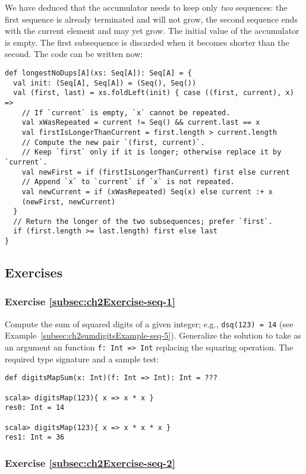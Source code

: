 We have deduced that the accumulator needs to keep only \emph{two}
sequences: the first sequence is already terminated and will not grow,
the second sequence ends with the current element and may yet grow.
The initial value of the accumulator is empty. The first subsequence
is discarded when it becomes shorter than the second. The code can
be written now:
\begin{lstlisting}
def longestNoDups[A](xs: Seq[A]): Seq[A] = {
  val init: (Seq[A], Seq[A]) = (Seq(), Seq())
  val (first, last) = xs.foldLeft(init) { case ((first, current), x) =>
    // If `current` is empty, `x` cannot be repeated.
    val xWasRepeated = current != Seq() && current.last == x
    val firstIsLongerThanCurrent = first.length > current.length
    // Compute the new pair `(first, current)`.
    // Keep `first` only if it is longer; otherwise replace it by `current`.
    val newFirst = if (firstIsLongerThanCurrent) first else current
    // Append `x` to `current` if `x` is not repeated.
    val newCurrent = if (xWasRepeated) Seq(x) else current :+ x
    (newFirst, newCurrent)
  }
  // Return the longer of the two subsequences; prefer `first`.
  if (first.length >= last.length) first else last
}
\end{lstlisting}


\subsection{Exercises}

\subsubsection{Exercise \label{subsec:ch2Exercise-seq-1}\ref{subsec:ch2Exercise-seq-1}}

Compute the sum of squared digits of a given integer; e.g., \lstinline!dsq(123) = 14!
(see Example~\ref{subsec:ch2sumdigitsExample-seq-5}). Generalize
the solution to take as an argument an function \lstinline!f: Int => Int!
replacing the squaring operation. The required type signature and
a sample test:
\begin{lstlisting}
def digitsMapSum(x: Int)(f: Int => Int): Int = ???

scala> digitsMap(123){ x => x * x }
res0: Int = 14

scala> digitsMap(123){ x => x * x * x }
res1: Int = 36
\end{lstlisting}


\subsubsection{Exercise \label{subsec:ch2Exercise-seq-2}\ref{subsec:ch2Exercise-seq-2}}

